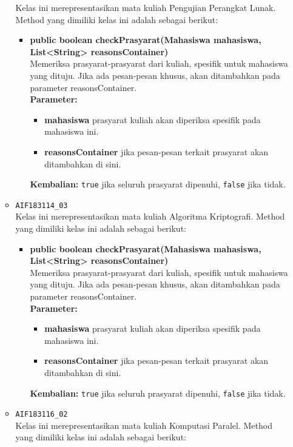 \begin{enumerate}
\begin{itemize}
		Kelas ini merepresentasikan mata kuliah Pengujian Perangkat Lunak. Method yang dimiliki kelas ini adalah sebagai berikut: 
		\begin{itemize}
			\item \textbf{public boolean checkPrasyarat(Mahasiswa mahasiswa, List<String> reasonsContainer)}\\
			Memeriksa prasyarat-prasyarat dari kuliah, spesifik untuk mahasiswa yang dituju. Jika ada pesan-pesan khusus, akan ditambahkan pada parameter reasonsContainer.\\
			\textbf{Parameter:}
			\begin{itemize}
				\item \textbf{mahasiswa} prasyarat kuliah akan diperiksa spesifik pada mahasiswa ini.
				\item \textbf{reasonsContainer} jika pesan-pesan terkait prasyarat akan ditambahkan di sini.
			\end{itemize}
			\textbf{Kembalian:} \texttt{true} jika seluruh prasyarat dipenuhi, \texttt{false} jika tidak.
		\end{itemize}
		\item \texttt{AIF183114\_03} \\
		Kelas ini merepresentasikan mata kuliah Algoritma Kriptografi. Method yang dimiliki kelas ini adalah sebagai berikut: 
		\begin{itemize}
			\item \textbf{public boolean checkPrasyarat(Mahasiswa mahasiswa, List<String> reasonsContainer)}\\
			Memeriksa prasyarat-prasyarat dari kuliah, spesifik untuk mahasiswa yang dituju. Jika ada pesan-pesan khusus, akan ditambahkan pada parameter reasonsContainer.\\
			\textbf{Parameter:}
			\begin{itemize}
				\item \textbf{mahasiswa} prasyarat kuliah akan diperiksa spesifik pada mahasiswa ini.
				\item \textbf{reasonsContainer} jika pesan-pesan terkait prasyarat akan ditambahkan di sini.
			\end{itemize}
			\textbf{Kembalian:} \texttt{true} jika seluruh prasyarat dipenuhi, \texttt{false} jika tidak.
		\end{itemize}
		\item \texttt{AIF183116\_02} \\
		Kelas ini merepresentasikan mata kuliah Komputasi Paralel. Method yang dimiliki kelas ini adalah sebagai berikut: 
		\begin{itemize}

\end{itemize}
\end{itemize}
\end{enumerate}
